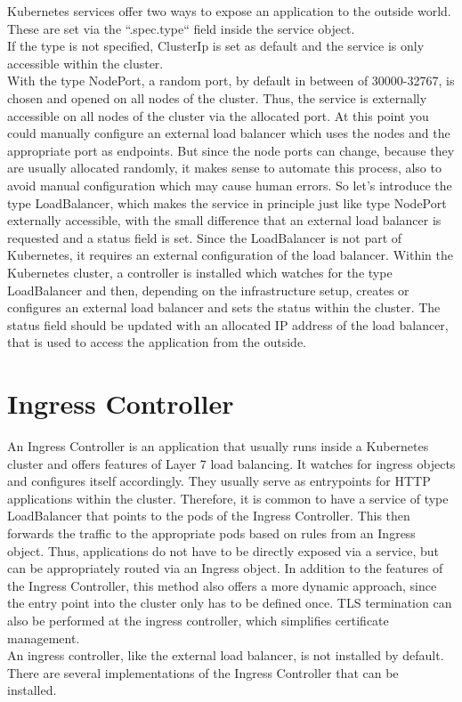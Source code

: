 Kubernetes services offer two ways to expose an application to the outside world.
These are set via the ``.spec.type`` field inside the service object.
\\
If the type is not specified, ClusterIp is set as default and the service is only accessible within the cluster.
\\
With the type NodePort, a random port, by default in between of 30000-32767, is chosen and opened on all nodes of the cluster.
Thus, the service is externally accessible on all nodes of the cluster via the allocated port.
At this point you could manually configure an external load balancer which uses the nodes and the appropriate port as endpoints.
But since the node ports can change, because they are usually allocated randomly, it makes sense to automate this process, also to avoid manual configuration which may cause human errors.
So let's introduce the type LoadBalancer, which makes the service in principle just like type NodePort externally accessible, with the small difference that an external load balancer is requested and a status field is set.
Since the LoadBalancer is not part of Kubernetes, it requires an external configuration of the load balancer.
Within the Kubernetes cluster, a controller is installed which watches for the type LoadBalancer and then, depending on the infrastructure setup, creates or configures an external load balancer and sets the status within the cluster.
The status field should be updated with an allocated IP address of the load balancer, that is used to access the application from the outside.~\cite{KUBERNETES-SERVICE}

\section{Ingress Controller}\label{sec:IngressController}

An Ingress Controller is an application that usually runs inside a Kubernetes cluster and offers features of Layer 7 load balancing.
It watches for ingress objects and configures itself accordingly.
They usually serve as entrypoints for HTTP applications within the cluster.
Therefore, it is common to have a service of type LoadBalancer that points to the pods of the Ingress Controller.
This then forwards the traffic to the appropriate pods based on rules from an Ingress object.
Thus, applications do not have to be directly exposed via a service, but can be appropriately routed via an Ingress object.
In addition to the features of the Ingress Controller, this method also offers a more dynamic approach, since the entry point into the cluster only has to be defined once.
TLS termination can also be performed at the ingress controller, which simplifies certificate management.~\cite{KUBERNETES-INGRESS}
\\
An ingress controller, like the external load balancer, is not installed by default.
There are several implementations of the Ingress Controller that can be installed.~\cite{KUBERNETES-INGRESS-CONTROLLER}

